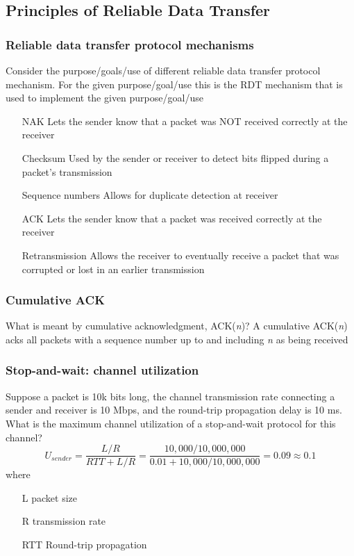 \newpage
\subsection*{Principles of Reliable Data Transfer}
    \subsubsection*{Reliable data transfer protocol mechanisms}
    \noindent Consider the purpose/goals/use of different reliable data transfer protocol mechanism. For the given
    purpose/goal/use this is the RDT mechanism that is used to implement the given purpose/goal/use
    \begin{itemize}
        \item[NAK] Lets the sender know that a packet was NOT received correctly at the receiver
        \item[Checksum] Used by the sender or receiver to detect bits flipped during a packet's transmission
        \item[Sequence numbers] Allows for duplicate detection at receiver
        \item[ACK] Lets the sender know that a packet was received correctly at the receiver  
        \item[Retransmission] Allows the receiver to eventually receive a packet that was corrupted or lost in an
        earlier transmission
    \end{itemize}

    \subsubsection*{Cumulative ACK}
    \noindent What is meant by cumulative acknowledgment, ACK(\textit{n})?
    A cumulative ACK(\textit{n}) acks all packets with a sequence number up to and including \textit{n} as being received

    \subsubsection*{Stop-and-wait: channel utilization}
    \noindent Suppose a packet is 10k bits long, the channel transmission rate connecting a sender and receiver is
    10 Mbps, and the round-trip propagation delay is 10 ms. What is the maximum channel utilization of a stop-and-wait
    protocol for this channel?
    \[U_{sender}=\frac{L/R}{RTT+L/R}=\frac{10,000/10,000,000}{0.01+10,000/10,000,000}=0.09\approx0.1\]
    where
    \begin{itemize}
        \item[L] packet size 
        \item[R] transmission rate
        \item[RTT]  Round-trip propagation
    \end{itemize}

